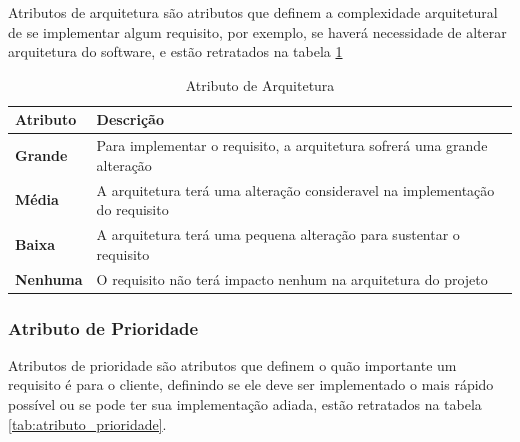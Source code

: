 Atributos de arquitetura são atributos que definem a complexidade arquitetural de se implementar algum requisito, por exemplo, se haverá necessidade de alterar arquitetura do software, e estão retratados na tabela \ref{tab:atributo_arquitetura}

\begin{table}[H]
\begin{tabular}{|p{4cm}|p{11cm}|}
\hline
\textbf{Atributo} &
\textbf{Descrição}
\\ \hline

\textbf{Grande} &
Para implementar o requisito, a arquitetura sofrerá uma grande alteração
\\ \hline

\textbf{Média} &
A arquitetura terá uma alteração consideravel na implementação do requisito
\\ \hline

\textbf{Baixa} &
A arquitetura terá uma pequena alteração para sustentar o requisito
\\ \hline

\textbf{Nenhuma} &
O requisito não terá impacto nenhum na arquitetura do projeto
\\ \hline
\end{tabular}
\caption{Atributo de Arquitetura}
\label{tab:atributo_arquitetura}
\end{table}

\subsubsection{Atributo de Prioridade\\}

Atributos de prioridade são atributos que definem o quão importante um requisito é para o cliente, definindo se ele deve ser implementado o mais rápido possível ou se pode ter sua implementação adiada, estão retratados na tabela \ref{tab:atributo_prioridade}.

